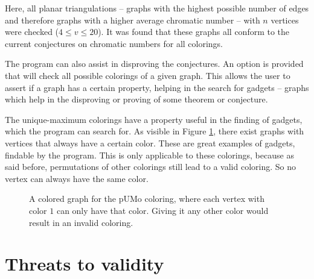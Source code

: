 \documentclass{article}
\begin{document}
Here, all planar triangulations -- graphs with the highest possible number of edges and therefore graphs with a higher average chromatic number -- with $n$ vertices were checked ($4 \le v \le 20$). It was found that these graphs all conform to the current conjectures on chromatic numbers for all colorings.

The program can also assist in disproving the conjectures. An option is provided that will check all possible colorings of a given graph. This allows the user to assert if a graph has a certain property, helping in the search for gadgets -- graphs which help in the disproving or proving of some theorem or conjecture. 

The unique-maximum colorings have a property useful in the finding of gadgets, which the program can search for. As visible in Figure \ref{fig:graph}, there exist graphs with vertices that always have a certain color. These are great examples of gadgets, findable by the program. This is only applicable to these colorings, because as said before, permutations of other colorings still lead to a valid coloring. So no vertex can always have the same color.

\begin{figure}
	\begin{center}
	\end{center}
	\caption{A colored graph for the $\mathrm{pUMo}$ coloring, where each vertex with color $1$ can only have that color. Giving it any other color would result in an invalid coloring.}\label{fig:graph}
\end{figure}


\section{Threats to validity}
\label{sec:threats}
\end{document}
